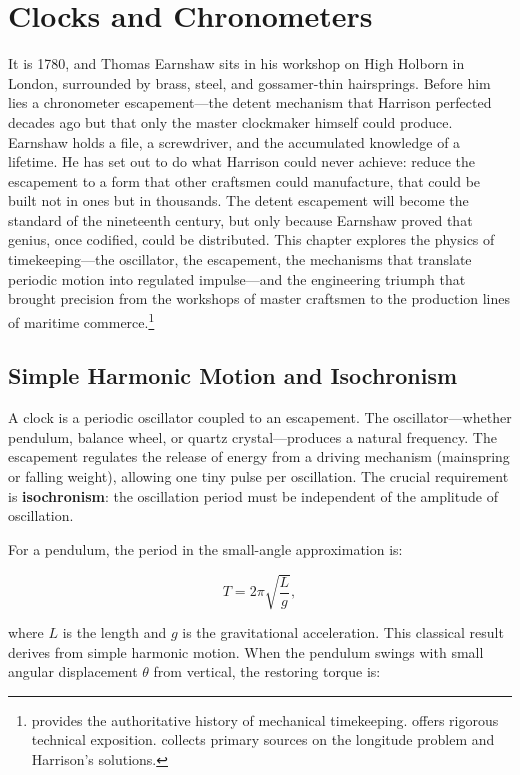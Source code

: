 \chapter{Clocks and Chronometers}
\label{ch:clocks-chronometers}

It is 1780, and Thomas Earnshaw sits in his workshop on High Holborn in London, surrounded by brass, steel, and gossamer-thin hairsprings. Before him lies a chronometer escapement---the detent mechanism that Harrison perfected decades ago but that only the master clockmaker himself could produce. Earnshaw holds a file, a screwdriver, and the accumulated knowledge of a lifetime. He has set out to do what Harrison could never achieve: reduce the escapement to a form that other craftsmen could manufacture, that could be built not in ones but in thousands. The detent escapement will become the standard of the nineteenth century, but only because Earnshaw proved that genius, once codified, could be distributed. This chapter explores the physics of timekeeping—the oscillator, the escapement, the mechanisms that translate periodic motion into regulated impulse—and the engineering triumph that brought precision from the workshops of master craftsmen to the production lines of maritime commerce.\footnote{\textcite{Landes1983} provides the authoritative history of mechanical timekeeping. \textcite{Rawlings1993} offers rigorous technical exposition. \textcite{Andrewes1996} collects primary sources on the longitude problem and Harrison's solutions.}

\section{Simple Harmonic Motion and Isochronism}

A clock is a periodic oscillator coupled to an escapement. The oscillator—whether pendulum, balance wheel, or quartz crystal—produces a natural frequency. The escapement regulates the release of energy from a driving mechanism (mainspring or falling weight), allowing one tiny pulse per oscillation. The crucial requirement is \textbf{isochronism}: the oscillation period must be independent of the amplitude of oscillation.

For a pendulum, the period in the small-angle approximation is:

\[
  T = 2\pi\sqrt{\frac{L}{g}},
\]

where $L$ is the length and $g$ is the gravitational acceleration. This classical result derives from simple harmonic motion. When the pendulum swings with small angular displacement $\theta$ from vertical, the restoring torque is:

